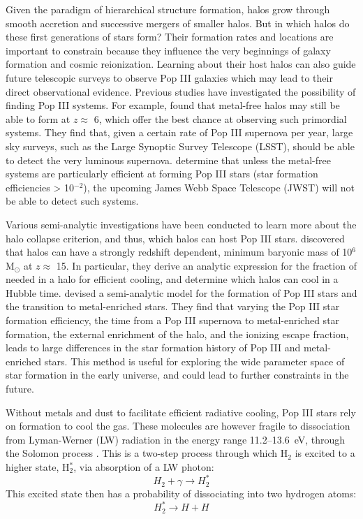 \documentclass[a4paper,fleqn,usenatbib]{mnras}
\begin{document}
Given the paradigm of hierarchical structure formation, halos grow through smooth accretion and successive mergers of smaller halos. But in which halos do these first generations of stars form? Their formation rates and locations are important to constrain because they influence the very beginnings of galaxy formation and cosmic reionization. Learning about their host halos can also guide future telescopic surveys to observe Pop III galaxies which may lead to their direct observational evidence. Previous studies have investigated the possibility of finding Pop III systems. For example, \citet{Trenti09} found that metal-free halos may still be able to form at $z \approx$ 6, which offer the best chance at observing such primordial systems. They find that, given a certain rate of Pop III supernova per year, large sky surveys, such as the Large Synoptic Survey Telescope (LSST), should be able to detect the very luminous supernova. \citet{Trenti09} determine that unless the metal-free systems are particularly efficient at forming Pop III stars (star formation efficiencies > 10$^{-2}$), the upcoming James Webb Space Telescope (JWST) will not be able to detect such systems.

Various semi-analytic investigations have been conducted to learn more about the halo collapse criterion, and thus, which halos can host Pop III stars. \citet{Tegmark97} discovered that halos can have a strongly redshift dependent, minimum baryonic mass of 10$^{6}$ M$_{\odot}$ at $z \approx$ 15. In particular, they derive an analytic expression for the fraction of \hh{} needed in a halo for efficient cooling, and determine which  halos can cool in a Hubble time. \citet{Visbal18} devised a semi-analytic model for the formation of Pop III stars and the transition to metal-enriched stars. They find that varying the Pop III star formation efficiency, the time from a Pop III supernova to metal-enriched star formation, the external enrichment of the halo, and the ionizing escape fraction, leads to large differences in the star formation history of Pop III and metal-enriched stars. This method is useful for exploring the wide parameter space of star formation in the early universe, and could lead to further constraints in the future. 

Without metals and dust to facilitate efficient radiative cooling, Pop III stars rely on \hh{} formation to cool the gas. These molecules are however fragile to dissociation from Lyman-Werner (LW) radiation in the energy range 11.2--13.6~eV, through the Solomon process \citep{Field66, Stecher67}. This is a two-step process through which H$_{2}$ is excited to a higher state, H$_{2}^{\ast}$, via absorption of a LW photon:
\begin{equation} \label{Solomon1}
	H_{2} + \gamma \rightarrow  H_{2}^{\ast}
\end{equation}
This excited state then has a probability of dissociating into two hydrogen atoms:
\begin{equation} \label{Solomon2}
	H_{2}^{\ast} \rightarrow H + H
\end{equation}
\end{document}
